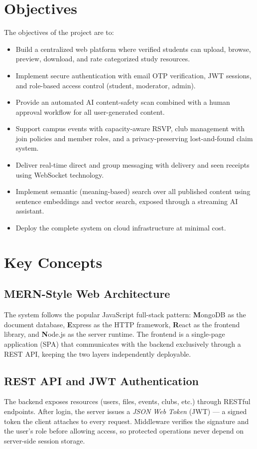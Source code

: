 \documentclass[12pt,a4paper]{report}
\begin{document}
\section{Objectives}
The objectives of the project are to:
\begin{itemize}[itemsep=2pt]
  \item Build a centralized web platform where verified students can
        upload, browse, preview, download, and rate categorized study
        resources.
  \item Implement secure authentication with email OTP verification,
        JWT sessions, and role-based access control (student,
        moderator, admin).
  \item Provide an automated AI content-safety scan combined with a
        human approval workflow for all user-generated content.
  \item Support campus events with capacity-aware RSVP, club
        management with join policies and member roles, and a
        privacy-preserving lost-and-found claim system.
  \item Deliver real-time direct and group messaging with delivery
        and seen receipts using WebSocket technology.
  \item Implement semantic (meaning-based) search over all published
        content using sentence embeddings and vector search, exposed
        through a streaming AI assistant.
  \item Deploy the complete system on cloud infrastructure at
        minimal cost.
\end{itemize}

\section{Key Concepts}
\subsection{MERN-Style Web Architecture}
The system follows the popular JavaScript full-stack pattern:
\textbf{M}ongoDB as the document database, \textbf{E}xpress as the
HTTP framework, \textbf{R}eact as the frontend library, and
\textbf{N}ode.js as the server runtime. The frontend is a
single-page application (SPA) that communicates with the backend
exclusively through a REST API, keeping the two layers independently
deployable.

\subsection{REST API and JWT Authentication}
The backend exposes resources (users, files, events, clubs, etc.)
through RESTful endpoints. After login, the server issues a
\textit{JSON Web Token} (JWT) --- a signed token the client attaches
to every request. Middleware verifies the signature and the user's
role before allowing access, so protected operations never depend on
server-side session storage.
\end{document}

